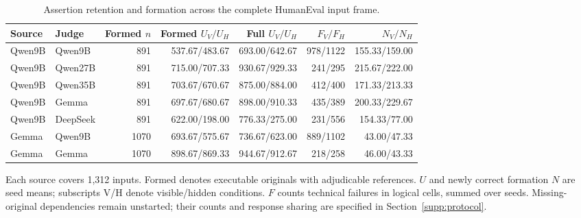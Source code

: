 \begin{table}[t]
\centering
\small
\caption{Assertion retention and formation across the complete HumanEval input frame.}
\label{tab:s_formation}
\begin{tabular}{llrrrrr}
\toprule
Source & Judge & Formed $n$ & Formed $U_V/U_H$ & Full $U_V/U_H$ & $F_V/F_H$ & $N_V/N_H$ \\
\midrule
Qwen9B & Qwen9B & 891 & 537.67/483.67 & 693.00/642.67 & 978/1122 & 155.33/159.00 \\
Qwen9B & Qwen27B & 891 & 715.00/707.33 & 930.67/929.33 & 241/295 & 215.67/222.00 \\
Qwen9B & Qwen35B & 891 & 703.67/670.67 & 875.00/884.00 & 412/400 & 171.33/213.33 \\
Qwen9B & Gemma & 891 & 697.67/680.67 & 898.00/910.33 & 435/389 & 200.33/229.67 \\
Qwen9B & DeepSeek & 891 & 622.00/198.00 & 776.33/275.00 & 231/556 & 154.33/77.00 \\
Gemma & Qwen9B & 1070 & 693.67/575.67 & 736.67/623.00 & 889/1102 & 43.00/47.33 \\
Gemma & Gemma & 1070 & 898.67/869.33 & 944.67/912.67 & 218/258 & 46.00/43.33 \\
\bottomrule
\end{tabular}
\par\smallskip
\begin{minipage}{\linewidth}
\footnotesize
Each source covers 1,312 inputs. Formed denotes executable originals with adjudicable references. $U$ and newly correct formation $N$ are seed means; subscripts V/H denote visible/hidden conditions. $F$ counts technical failures in logical cells, summed over seeds. Missing-original dependencies remain unstarted; their counts and response sharing are specified in Section~\ref{supp:protocol}.
\end{minipage}
\end{table}
